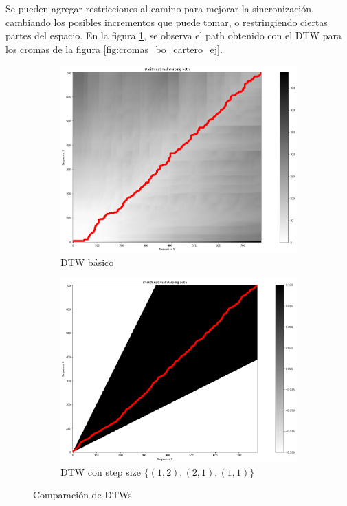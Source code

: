 \documentclass{article}
\begin{document}
Se pueden agregar restricciones al camino para mejorar la sincronización, cambiando los posibles incrementos que puede tomar, o restringiendo ciertas partes del espacio. En la figura \ref{fig:distintos_DTW}, se observa el path obtenido con el DTW para los cromas de la figura \ref{fig:cromas_bo_cartero_ej}.

\begin{figure}[!htb]
    \centering
    \begin{subfigure}{0.49\textwidth}
        \includegraphics[width=\textwidth]{dtws/dtw_bo_cartero.png}
        \caption{DTW básico}
    \end{subfigure}
    \begin{subfigure}{0.49\textwidth}
        \includegraphics[width=\textwidth]{dtws/dtw_bo_cartero_step_size.png}
        \caption{DTW con step size $\{(1,2), (2,1), (1,1)\}$}
    \end{subfigure}
    \caption{Comparación de DTWs }
    \label{fig:distintos_DTW}
\end{figure}
\end{document}
